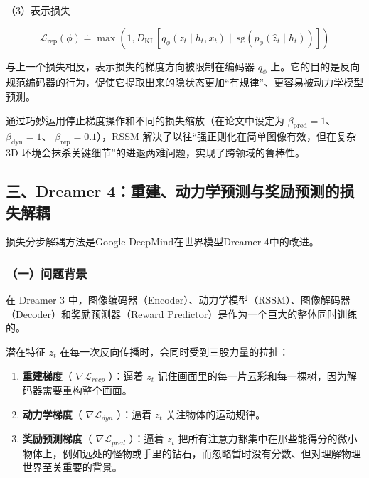 （3）表示损失

\[
\mathcal{L}_{\mathrm{rep}}(\phi)
\doteq
\max\left(
1,
D_{\mathrm{KL}}\left[
q_{\phi}(z_t \mid h_t, x_t)
\parallel
\mathrm{sg}(p_{\phi}(\hat{z}_t \mid h_t))
\right]
\right)
\]

与上一个损失相反，表示损失的梯度方向被限制在编码器 \(q_{\phi}\) 上。它的目的是反向规范编码器的行为，促使它提取出来的隐状态更加``有规律''、更容易被动力学模型预测。

通过巧妙运用停止梯度操作和不同的损失缩放（在论文中设定为 \(\beta_{\mathrm{pred}} = 1\)、 \(\beta_{\mathrm{dyn}} = 1\)、 \(\beta_{\mathrm{rep}} = 0.1\)），RSSM 解决了以往``强正则化在简单图像有效，但在复杂 3D 环境会抹杀关键细节''的进退两难问题，实现了跨领域的鲁棒性。

\hypertarget{ux4e09dreamer-4ux91cdux5efaux52a8ux529bux5b66ux9884ux6d4bux4e0eux5956ux52b1ux9884ux6d4bux7684ux635fux5931ux89e3ux8026}{%
\subsection{三、Dreamer 4：重建、动力学预测与奖励预测的损失解耦}\label{ux4e09dreamer-4ux91cdux5efaux52a8ux529bux5b66ux9884ux6d4bux4e0eux5956ux52b1ux9884ux6d4bux7684ux635fux5931ux89e3ux8026}}

损失分步解耦方法是Google DeepMind在世界模型Dreamer 4中的改进。

\hypertarget{ux4e00ux95eeux9898ux80ccux666f-7}{%
\subsubsection{（一）问题背景}\label{ux4e00ux95eeux9898ux80ccux666f-7}}

在 Dreamer 3 中，图像编码器（Encoder）、动力学模型（RSSM）、图像解码器（Decoder）和奖励预测器（Reward Predictor）是作为一个巨大的整体同时训练的。

潜在特征 \(z_t\) 在每一次反向传播时，会同时受到三股力量的拉扯：

\begin{enumerate}
\def\labelenumi{\arabic{enumi}.}
\tightlist
\item
  \textbf{重建梯度}（ \(\nabla \mathcal{L}_{recp}\) ）：逼着 \(z_t\) 记住画面里的每一片云彩和每一棵树，因为解码器需要重构整个画面。
\item
  \textbf{动力学梯度}（ \(\nabla \mathcal{L}_{dyn}\) ）：逼着 \(z_t\) 关注物体的运动规律。
\item
  \textbf{奖励预测梯度}（ \(\nabla \mathcal{L}_{pred}\) ）：逼着 \(z_t\) 把所有注意力都集中在那些能得分的微小物体上，例如远处的怪物或手里的钻石，而忽略暂时没有分数、但对理解物理世界至关重要的背景。
\end{enumerate}

